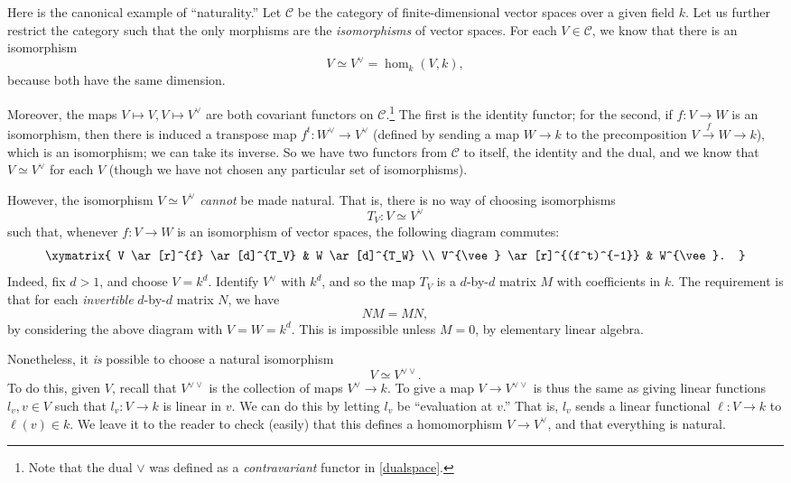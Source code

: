 \begin{example}
Here is the canonical example of ``naturality.''
Let $\mathcal{C}$ be the category of finite-dimensional vector spaces over a
given field $k$. Let us further restrict the category such that the only
morphisms are the \emph{isomorphisms} of vector spaces.
For each $V \in \mathcal{C}$, we know that there is an isomorphism
\[ V \simeq V^{\vee} = \hom_k(V, k),  \]
because both have the same dimension. 

Moreover, the maps $V \mapsto V, V \mapsto V^{\vee}$ are both covariant functors on
$\mathcal{C}$.\footnote{Note that the dual $\vee$ was defined as a
\emph{contravariant} functor in \cref{dualspace}.} The first is the identity functor; for the second, if $f: V \to
W$ is an isomorphism, then there is induced a transpose map $f^t: W^{\vee} \to V^{\vee}$
(defined by sending a map $W \to k$ to the precomposition $V \stackrel{f}{\to}
W \to k$), which is an isomorphism; we can take its inverse.
So we have two functors from $\mathcal{C}$ to itself, the identity and the
dual, and we know that $V \simeq V^{\vee}$ for each $V$ (though we have not
chosen any particular set of isomorphisms).


However, the isomorphism $V \simeq
V^{\vee}$ \emph{cannot} be made natural. That is, there is no way of choosing
isomorphisms
\[ T_V: V \simeq V^{\vee}  \]
such that, 
whenever $f: V \to W$ is an isomorphism of vector spaces, the following diagram
commutes:
\[ \xymatrix{
V \ar[r]^{f} \ar[d]^{T_V}  &  W \ar[d]^{T_W} \\
V^{\vee} \ar[r]^{(f^t)^{-1}} &  W^{\vee}.
}\]
Indeed, fix $d>1$, and choose $V = k^d$. 
Identify $V^{\vee}$ with $k^d$, and so the map $T_V$ is a $d$-by-$d$ matrix $M$
with coefficients in $k$. The requirement is that for each \emph{invertible}
$d$-by-$d$ matrix $N$, we have
\[ NM = MN,  \]
by considering the above diagram with $V = W = k^d$.
This is impossible unless $M = 0$, by elementary linear algebra.

Nonetheless, it \emph{is} possible to choose a natural isomorphism
\[ V \simeq V^{\vee \vee}.  \]
To do this, given $V$, recall that $V^{\vee \vee}$ is the collection of maps
$V^{\vee} \to k$. To give a map $V \to V^{\vee \vee}$ is thus the same as
giving linear functions $l_v, v \in V$ such that $l_v: V \to k$ is linear in
$v$. We can do this by letting $l_v$ be ``evaluation at $v$.''
That is, $l_v$ sends a linear functional $\ell: V \to k$ to $\ell(v) \in k$. We
leave it to the reader to check (easily) that this defines a homomorphism $V
\to V^{\vee}$, and that everything is natural.
\end{example}





